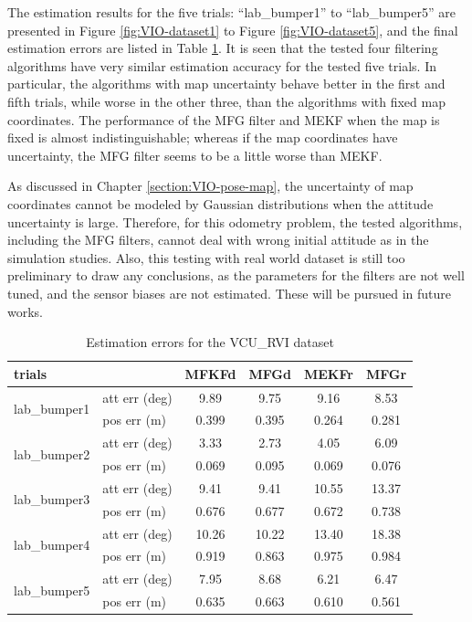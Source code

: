 The estimation results for the five trials: ``lab\_bumper1'' to ``lab\_bumper5'' are presented in Figure \ref{fig:VIO-dataset1} to Figure \ref{fig:VIO-dataset5}, and the final estimation errors are listed in Table \ref{tab:VIO-VCU_RVI}. 
It is seen that the tested four filtering algorithms have very similar estimation accuracy for the tested five trials.
In particular, the algorithms with map uncertainty behave better in the first and fifth trials, while worse in the other three, than the algorithms with fixed map coordinates.
The performance of the MFG filter and MEKF when the map is fixed is almost indistinguishable; whereas if the map coordinates have uncertainty, the MFG filter seems to be a little worse than MEKF.

As discussed in Chapter \ref{section:VIO-pose-map}, the uncertainty of map coordinates cannot be modeled by Gaussian distributions when the attitude uncertainty is large.
Therefore, for this odometry problem, the tested algorithms, including the MFG filters, cannot deal with wrong initial attitude as in the simulation studies.
Also, this testing with real world dataset is still too preliminary to draw any conclusions, as the parameters for the filters are not well tuned, and the sensor biases are not estimated.
These will be pursued in future works.

\begin{table}
	\centering
	\caption{Estimation errors for the VCU\_RVI dataset}
	\label{tab:VIO-VCU_RVI}
	\begin{tabular}{l|l|cccc}
		\hline\hline
		trials & & MFKFd & MFGd & MEKFr & MFGr \\ \hline
		\multirow{2}{*}{lab\_bumper1} & att err (deg) & 9.89 & 9.75 & 9.16 & 8.53 \\
		& pos err (m) & 0.399 & 0.395 & 0.264 & 0.281 \\ \hline
		\multirow{2}{*}{lab\_bumper2} & att err (deg) & 3.33 & 2.73 & 4.05 & 6.09 \\
		& pos err (m) & 0.069 & 0.095 & 0.069 & 0.076 \\ \hline
		\multirow{2}{*}{lab\_bumper3} & att err (deg) & 9.41 & 9.41 & 10.55 & 13.37 \\
		& pos err (m) & 0.676 & 0.677 & 0.672 & 0.738 \\ \hline
		\multirow{2}{*}{lab\_bumper4} & att err (deg) & 10.26 & 10.22 & 13.40 & 18.38 \\
		& pos err (m) & 0.919 & 0.863 & 0.975 & 0.984 \\ \hline
		\multirow{2}{*}{lab\_bumper5} & att err (deg) & 7.95 & 8.68 & 6.21 & 6.47 \\
		& pos err (m) & 0.635 & 0.663 & 0.610 & 0.561 \\
		\hline\hline
	\end{tabular}
\end{table}

